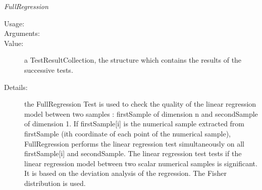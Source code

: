 \begin{description}
\begin{description}
\item \textit{FullRegression}
\begin{description}
\item[Usage:] \rule{0pt}{1em}
\item[Arguments:] \rule{0pt}{1em}
\item[Value:]  a TestResultCollection, the structure which contains the results of the successive tests.
\item[Details:] the FullRegression Test is used to check the quality of the linear regression model between two samples :  firstSample of dimension n and secondSample of dimension 1. If firstSample[i] is the numerical sample extracted from firstSample (ith coordinate of each point of the numerical sample), FullRegression performs the linear regression test simultaneously on all firstSample[i] and secondSample. The linear regression test tests if the linear regression model between two scalar numerical samples is significant. It is based on the deviation analysis of the regression. The Fisher distribution is used.
\end{description}
\bigskip


\end{description}
\end{description}
